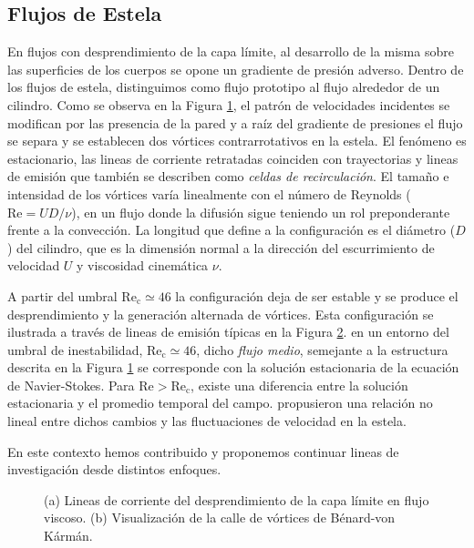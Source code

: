 \documentclass[12pt]{article}
\begin{document}
\subsection*{Flujos de Estela}
En flujos con desprendimiento de la capa límite, al desarrollo de la misma sobre las superficies de los cuerpos se opone un gradiente de presión adverso. Dentro de los flujos de estela, distinguimos como  flujo prototipo  al flujo alrededor de un cilindro\cite{williamson1988}. Como se observa en la Figura \ref{fig:cyl}, el patrón  de velocidades incidentes se modifican por las presencia de la pared y a raíz del gradiente de presiones el flujo se separa y se establecen  dos vórtices contrarrotativos en la estela. El fenómeno es estacionario, las lineas de corriente retratadas coinciden con trayectorias y lineas de emisión que también se describen como \textit{celdas de recirculación}. 
 El tamaño e intensidad de los vórtices varía linealmente con el número de Reynolds  ($\mathrm{Re}=UD/\nu$), en un flujo donde la difusión sigue teniendo un rol preponderante frente a la convección. La longitud que define a la configuración es el diámetro ($D$) del cilindro, que es la dimensión normal a la dirección del escurrimiento de velocidad $U$ y viscosidad cinemática $\nu$. 
  
A partir del umbral $\mathrm{Re_c}\simeq 46$ la configuración deja de ser estable  y se produce el desprendimiento y la
generación alternada de vórtices.  Esta configuración se ilustrada a través de lineas de emisión típicas en la Figura \ref{fig:bvk}. en un entorno del umbral de inestabilidad, $\mathrm{Re_c}\simeq46$, dicho \textit{flujo medio}, semejante a la estructura descrita en la Figura \ref{fig:cyl} se corresponde con la solución estacionaria de la ecuación de Navier-Stokes. Para  $\mathrm{Re}>\mathrm{Re_c}$, existe una diferencia entre la solución estacionaria y el promedio temporal del campo.  \citet{Zielinska:1997p415} propusieron una relación no lineal  entre dichos cambios y  las fluctuaciones de velocidad en la estela. 


En este contexto hemos contribuido y proponemos continuar lineas de investigación desde distintos enfoques.

\begin{figure}
	\begin{subfigure}{.49\textwidth}
	\fbox{\resizebox{\columnwidth}{!}{%
				}}
		\subcaption{}\label{fig:cyl}
	\end{subfigure}\hfill
	\begin{subfigure}{.49\textwidth}
	\fbox{\resizebox{\columnwidth}{!}{%
				}}
	\subcaption{}\label{fig:bvk}
	\end{subfigure}\hfill

	\caption{(a) Lineas de corriente del desprendimiento de la capa límite en flujo viscoso. (b) Visualización de la calle de vórtices de Bénard-von Kármán.}\label{fig:cylinder_flow}

\end{figure}
\end{document}
